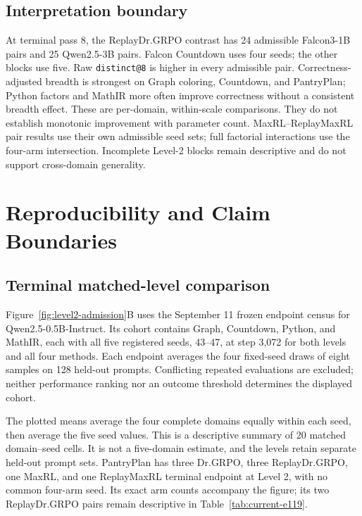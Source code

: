 \documentclass{article}
\newcommand{\1}{\mathbf 1}
\theoremstyle{remark}
\theoremstyle{definition}
\theoremstyle{plain}
\begin{document}
\subsection{Interpretation boundary}
\label{app:scale-boundary}

At terminal pass 8, the ReplayDr.GRPO contrast has 24 admissible Falcon3-1B
pairs and 25 Qwen2.5-3B pairs. Falcon Countdown uses four seeds; the other
blocks use five. Raw \texttt{distinct@8} is higher in every admissible pair. Correctness-adjusted
breadth is strongest on Graph coloring, Countdown, and PantryPlan; Python
factors and MathIR more often improve correctness without a consistent breadth effect. These are per-domain,
within-scale comparisons. They do not establish monotonic improvement with
parameter count. MaxRL--ReplayMaxRL pair results use their own admissible seed sets;
full factorial interactions use the four-arm intersection. Incomplete Level-2
blocks remain descriptive and do not support cross-domain generality.

\section{Reproducibility and Claim Boundaries}
\label{app:reproducibility}

\subsection{Terminal matched-level comparison}
\label{app:level2-interim}

Figure~\ref{fig:level2-admission}B uses the September 11 frozen endpoint
census for Qwen2.5-0.5B-Instruct. Its cohort contains Graph, Countdown,
Python, and MathIR, each with all five registered seeds, 43--47, at step
3,072 for both levels and all four methods. Each endpoint averages the four
fixed-seed draws of eight samples on 128 held-out prompts. Conflicting
repeated evaluations are excluded; neither performance ranking nor an
outcome threshold determines the displayed cohort.

The plotted means average the four complete domains equally within each
seed, then average the five seed values. This is a descriptive summary of
20 matched domain--seed cells. It is not a five-domain estimate, and the
levels retain separate held-out prompt sets. PantryPlan has three Dr.GRPO,
three ReplayDr.GRPO, one MaxRL, and one ReplayMaxRL terminal endpoint at
Level 2, with no common four-arm seed. Its exact arm counts accompany the
figure; its two ReplayDr.GRPO pairs remain descriptive in
Table~\ref{tab:current-e119}.
\end{document}
